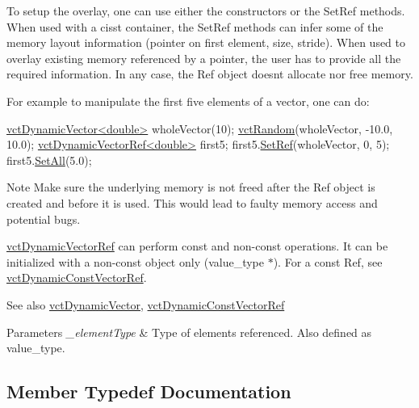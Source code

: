 To setup the overlay, one can use either the constructors or the Set\+Ref methods. When used with a cisst container, the Set\+Ref methods can infer some of the memory layout information (pointer on first element, size, stride). When used to overlay existing memory referenced by a pointer, the user has to provide all the required information. In any case, the Ref object doesn\textquotesingle{}t allocate nor free memory.

For example to manipulate the first five elements of a vector, one can do\+: 
\begin{DoxyCode}
\hyperlink{classvct_dynamic_vector}{vctDynamicVector<double>} wholeVector(10);
\hyperlink{group__cisst_vector_ga0d25660a2dc6ef9c093f6f6b2804d2d0}{vctRandom}(wholeVector, -10.0, 10.0);
\hyperlink{classvct_dynamic_vector_ref}{vctDynamicVectorRef<double>} first5;
first5.\hyperlink{classvct_dynamic_vector_ref_aafa4ebcfe74bf97ca55f902f8864722f}{SetRef}(wholeVector, 0, 5);
first5.\hyperlink{classvct_dynamic_vector_base_a0cf13429dcd83b565c3cbd7e30ecdec7}{SetAll}(5.0);
\end{DoxyCode}


\begin{DoxyNote}{Note}
Make sure the underlying memory is not freed after the Ref object is created and before it is used. This would lead to faulty memory access and potential bugs.

\hyperlink{classvct_dynamic_vector_ref}{vct\+Dynamic\+Vector\+Ref} can perform const and non-\/const operations. It can be initialized with a non-\/const object only ({\ttfamily value\+\_\+type $\ast$}). For a const Ref, see \hyperlink{classvct_dynamic_const_vector_ref}{vct\+Dynamic\+Const\+Vector\+Ref}.
\end{DoxyNote}
\begin{DoxySeeAlso}{See also}
\hyperlink{classvct_dynamic_vector}{vct\+Dynamic\+Vector}, \hyperlink{classvct_dynamic_const_vector_ref}{vct\+Dynamic\+Const\+Vector\+Ref}
\end{DoxySeeAlso}

\begin{DoxyParams}{Parameters}
{\em \+\_\+element\+Type} & Type of elements referenced. Also defined as {\ttfamily value\+\_\+type}. \\
\hline
\end{DoxyParams}


\subsection{Member Typedef Documentation}
\hypertarget{classvct_dynamic_vector_ref_acebe42b08620767155f3b769ce292163}{}
